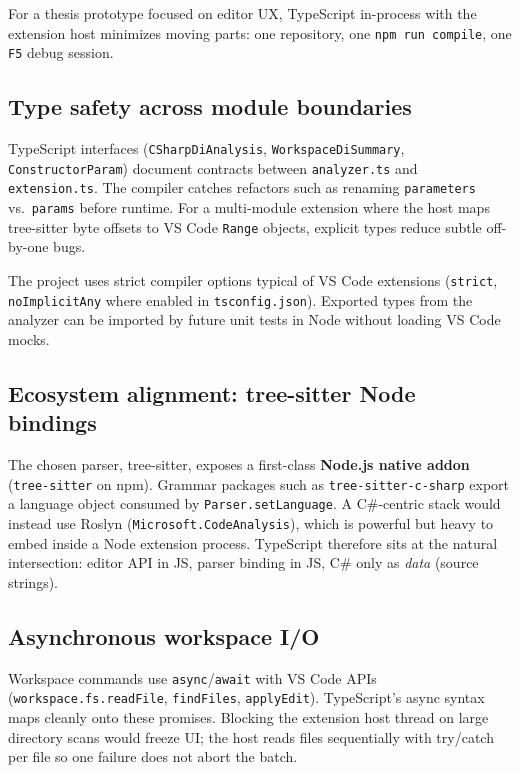 For a thesis prototype focused on editor UX, TypeScript in-process with the extension host minimizes moving parts: one repository, one \texttt{npm run compile}, one \texttt{F5} debug session.

\subsection{Type safety across module boundaries}

TypeScript interfaces (\texttt{CSharpDiAnalysis}, \texttt{WorkspaceDiSummary}, \texttt{ConstructorParam}) document contracts between \texttt{analyzer.ts} and \texttt{extension.ts}. The compiler catches refactors such as renaming \texttt{parameters} vs.\ \texttt{params} before runtime. For a multi-module extension where the host maps tree-sitter byte offsets to VS Code \texttt{Range} objects, explicit types reduce subtle off-by-one bugs.

The project uses strict compiler options typical of VS Code extensions (\texttt{strict}, \texttt{noImplicitAny} where enabled in \texttt{tsconfig.json}). Exported types from the analyzer can be imported by future unit tests in Node without loading VS Code mocks.

\subsection{Ecosystem alignment: tree-sitter Node bindings}

The chosen parser, tree-sitter, exposes a first-class \textbf{Node.js native addon} (\texttt{tree-sitter} on npm). Grammar packages such as \texttt{tree-sitter-c-sharp} export a language object consumed by \texttt{Parser.setLanguage}. A C\#-centric stack would instead use Roslyn (\texttt{Microsoft.CodeAnalysis}), which is powerful but heavy to embed inside a Node extension process. TypeScript therefore sits at the natural intersection: editor API in JS, parser binding in JS, C\# only as \emph{data} (source strings).

\subsection{Asynchronous workspace I/O}

Workspace commands use \texttt{async}/\texttt{await} with VS Code APIs (\texttt{workspace.fs.readFile}, \texttt{findFiles}, \texttt{applyEdit}). TypeScript's async syntax maps cleanly onto these promises. Blocking the extension host thread on large directory scans would freeze UI; the host reads files sequentially with try/catch per file so one failure does not abort the batch.

